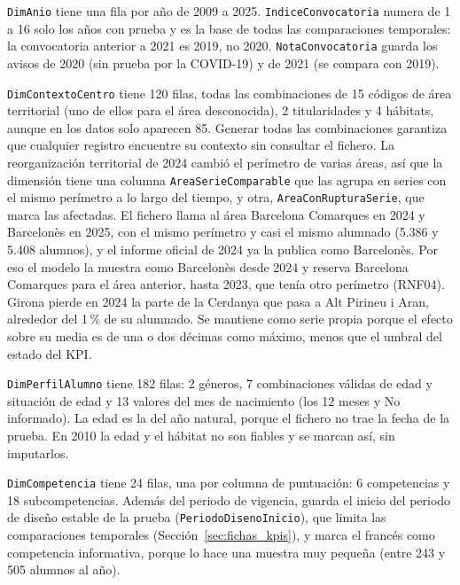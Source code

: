 \documentclass[12pt, a4paper, oneside]{report}
\begin{document}
\texttt{DimAnio} tiene una fila por año de 2009 a 2025. \texttt{IndiceConvocatoria} numera de 1 a 16 solo los años con prueba y es la base de todas las comparaciones temporales: la convocatoria anterior a 2021 es 2019, no 2020. \texttt{NotaConvocatoria} guarda los avisos de 2020 (sin prueba por la COVID-19) y de 2021 (se compara con 2019).

\texttt{DimContextoCentro} tiene 120 filas, todas las combinaciones de 15 códigos de área territorial (uno de ellos para el área desconocida), 2 titularidades y 4 hábitats, aunque en los datos solo aparecen 85. Generar todas las combinaciones garantiza que cualquier registro encuentre su contexto sin consultar el fichero. La reorganización territorial de 2024 cambió el perímetro de varias áreas, así que la dimensión tiene una columna \texttt{AreaSerieComparable} que las agrupa en series con el mismo perímetro a lo largo del tiempo, y otra, \texttt{AreaConRupturaSerie}, que marca las afectadas. El fichero llama al área \guillemotleft{}Barcelona Comarques\guillemotright{} en 2024 y \guillemotleft{}Barcelonès\guillemotright{} en 2025, con el mismo perímetro y casi el mismo alumnado (5.386 y 5.408 alumnos), y el informe oficial de 2024 ya la publica como \guillemotleft{}Barcelonès\guillemotright{}. Por eso el modelo la muestra como \guillemotleft{}Barcelonès\guillemotright{} desde 2024 y reserva \guillemotleft{}Barcelona Comarques\guillemotright{} para el área anterior, hasta 2023, que tenía otro perímetro (RNF04). Girona pierde en 2024 la parte de la Cerdanya que pasa a Alt Pirineu i Aran, alrededor del 1\,\% de su alumnado. Se mantiene como serie propia porque el efecto sobre su media es de una o dos décimas como máximo, menos que el umbral del estado del KPI.

\texttt{DimPerfilAlumno} tiene 182 filas: 2 géneros, 7 combinaciones válidas de edad y situación de edad y 13 valores del mes de nacimiento (los 12 meses y \guillemotleft{}No informado\guillemotright{}). La edad es la del año natural, porque el fichero no trae la fecha de la prueba. En 2010 la edad y el hábitat no son fiables y se marcan así, sin imputarlos.

\texttt{DimCompetencia} tiene 24 filas, una por columna de puntuación: 6 competencias y 18 subcompetencias. Además del periodo de vigencia, guarda el inicio del periodo de diseño estable de la prueba (\texttt{PeriodoDisenoInicio}), que limita las comparaciones temporales (Sección~\ref{sec:fichas_kpis}), y marca el francés como competencia informativa, porque lo hace una muestra muy pequeña (entre 243 y 505 alumnos al año).
\end{document}
